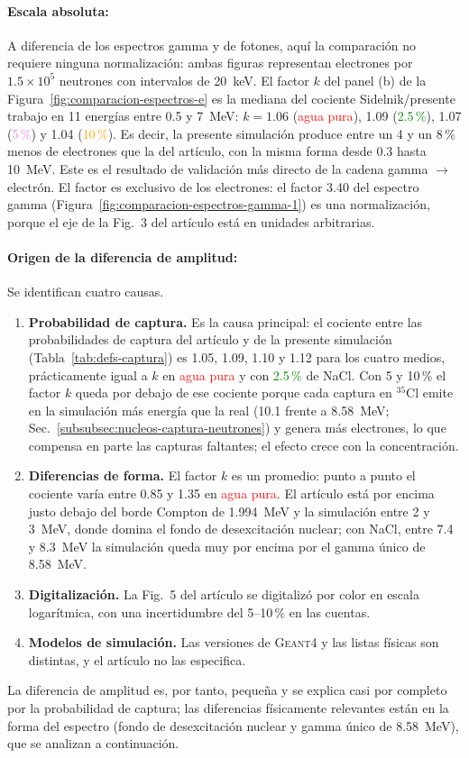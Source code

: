 \paragraph{Escala absoluta:} A diferencia de los espectros gamma y de fotones, aquí la comparación no requiere ninguna normalización: ambas figuras representan electrones por $1.5\times10^{5}$ neutrones con intervalos de 20~keV. El factor $k$ del panel (b) de la Figura~\ref{fig:comparacion-espectros-e} es la mediana del cociente Sidelnik/presente trabajo en 11 energías entre 0.5 y 7~MeV: $k=1.06$ (\textcolor{red}{agua pura}), 1.09 (\textcolor{green}{2.5\,\%}), 1.07 (\textcolor{violet}{5\,\%}) y 1.04 (\textcolor{orange}{10\,\%}). Es decir, la presente simulación produce entre un 4 y un 8\,\% menos de electrones que la del artículo, con la misma forma desde 0.3 hasta 10~MeV. Este es el resultado de validación más directo de la cadena gamma $\to$ electrón. El factor es exclusivo de los electrones: el factor 3.40 del espectro gamma (Figura~\ref{fig:comparacion-espectros-gamma-1}) es una normalización, porque el eje de la Fig.~3 del artículo está en unidades arbitrarias.

\paragraph{Origen de la diferencia de amplitud:} Se identifican cuatro causas.
\begin{enumerate}[label=(\roman*)]
	\item \textbf{Probabilidad de captura.} Es la causa principal: el cociente entre las probabilidades de captura del artículo y de la presente simulación (Tabla~\ref{tab:defs-captura}) es 1.05, 1.09, 1.10 y 1.12 para los cuatro medios, prácticamente igual a $k$ en \textcolor{red}{agua pura} y con \textcolor{green}{2.5\,\%} de NaCl. Con 5 y 10\,\% el factor $k$ queda por debajo de ese cociente porque cada captura en $^{35}$Cl emite en la simulación más energía que la real (10.1 frente a 8.58~MeV; Sec.~\ref{subsubsec:nucleos-captura-neutrones}) y genera más electrones, lo que compensa en parte las capturas faltantes; el efecto crece con la concentración.
	\item \textbf{Diferencias de forma.} El factor $k$ es un promedio: punto a punto el cociente varía entre 0.85 y 1.35 en \textcolor{red}{agua pura}. El artículo está por encima justo debajo del borde Compton de 1.994~MeV y la simulación entre 2 y 3~MeV, donde domina el fondo de desexcitación nuclear; con NaCl, entre 7.4 y 8.3~MeV la simulación queda muy por encima por el gamma único de 8.58~MeV.
	\item \textbf{Digitalización.} La Fig.~5 del artículo se digitalizó por color en escala logarítmica, con una incertidumbre del 5--10\,\% en las cuentas.
	\item \textbf{Modelos de simulación.} Las versiones de \textsc{Geant4} y las listas físicas son distintas, y el artículo no las especifica.
\end{enumerate}
\noindent La diferencia de amplitud es, por tanto, pequeña y se explica casi por completo por la probabilidad de captura; las diferencias físicamente relevantes están en la forma del espectro (fondo de desexcitación nuclear y gamma único de 8.58~MeV), que se analizan a continuación.

